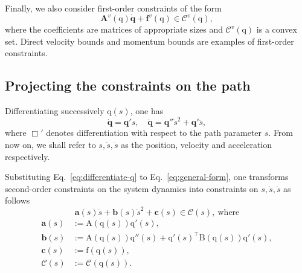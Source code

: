 \documentclass[journal]{IEEEtran}
\theoremstyle{plain}
\theoremstyle{definition}
\theoremstyle{definition}
\renewcommand{\vec}[1]{\bm{\mathrm{#1}}}  %
\newcommand{\cC}{\mathscr{C}}
\newcommand{\bfxi}{\mathbf{\xi}}
\begin{document}

Finally, we also consider first-order constraints of the form
\begin{equation*}
  \mathbf{A}^v(\vec q) \dot{\mathbf{q}} +
  \mathbf{f}^v(\vec q) \in \cC^v(\vec q),
\end{equation*}
where the coefficients are matrices of appropriate sizes and
$\cC^v(\vec q)$ is a convex set. Direct velocity bounds and momentum
bounds are examples of first-order constraints.


\subsection{Projecting the constraints on the path}
\label{sec:proj-constr-geom}


Differentiating successively $\vec q(s)$, one has
\begin{equation}
  \label{eq:differentiate-q}
  \dot {\mathbf{q}} = \mathbf{q}'\dot s, \quad
  \ddot {\mathbf{q}} = \mathbf{q}''\dot s^2 + \mathbf{q}'\ddot s,
\end{equation}
where $\Box'$ denotes differentiation with respect to the path
parameter $s$. From now on, we shall refer to $s, \dot s, \ddot s$ as
the position, velocity and acceleration respectively.

Substituting Eq.~\eqref{eq:differentiate-q} to Eq.~\eqref{eq:general-form}, one transforms
second-order constraints on the system dynamics into constraints on
$s, \dot s, \ddot s$ as follows
\begin{equation}
  \label{eq:lp-in-path}
    \mathbf{a}(s) \ddot s + \mathbf{b}(s) \dot s^2+ \mathbf{c}(s) \in
    \cC(s),\ \textrm{where}
\end{equation}
\begin{equation*}
  \begin{aligned}
    \mathbf{a}(s)&:=\vec A (\vec q (s)) \vec{q}'(s),\\
    \mathbf{b}(s)&:=\vec A (\vec q (s))\vec{q}''(s) +
    \vec{q}'(s)^\top \vec B (\vec q (s))\vec{q}'(s),\\
    \mathbf{c}(s)&:= \vec f (\vec q (s)), \\
    \cC(s) &:= \cC(\vec q(s)).
  \end{aligned}
\end{equation*}
\end{document}

